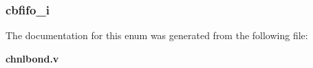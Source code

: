 \subsubsection[{ra\-\_\-en}]{ {\bfseries \textcolor{vhdlchar}{ }} \hspace{0.3cm}}\label{enum1chnlbond_a3ca5d862110d70ace1ecdacbcd204f3e}
\subsubsection[{D\-R\-A\-M16\-X\-N}]{ {\bfseries \textcolor{vhdlchar}{cbfifo\-\_\-i}\textcolor{vhdlchar}{ }} \hspace{0.3cm}}\label{enum1chnlbond_a16e02f8532f6d126886913d58fe7eb54}


The documentation for this enum was generated from the following file\-:\begin{DoxyCompactItemize}
\item 
{\bf chnlbond.\-v}\end{DoxyCompactItemize}
